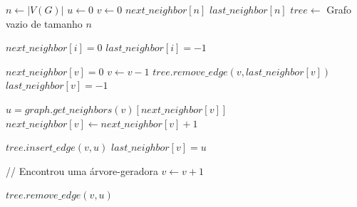 \begin{algorithm}[!hp]
\begin{footnotesize}
\SetAlgoLined
{}
\Begin
{
    $n \gets |V(G)|$\;
    $u \gets 0$\;
    $v \gets 0$\;
    $next\_neighbor[n]$\;
    $last\_neighbor[n]$\;
    $tree \gets$ Grafo vazio de tamanho $n$\;

    {
        $next\_neighbor[i] = 0$\;
        $last\_neighbor[i] = -1$\;
    }

    {
        {
            $next\_neighbor[v] = 0$\;
            $v \gets v - 1$\;
            {
                \Break
            }
            $tree.remove\_edge(v, last\_neighbor[v])$\;
            $last\_neighbor[v] = -1$\;
        }
        \Else
        {
            $u = graph.get\_neighbors(v)[next\_neighbor[v]]$\;
            $next\_neighbor[v] \gets next\_neighbor[v] + 1$\;

            {
                $tree.insert\_edge(v, u)$\;
                $last\_neighbor[v] = u$

                {
                    {
                        // Encontrou uma árvore-geradora
                    }
                    \Else
                    {
                        $v \gets v + 1$\;
                    }
                }

                $tree.remove\_edge(v, u)$\;
            }
        }
    }
}
\caption{\textsc{$generate\_sequential$}\label{alg:generate_sequential}}
\end{footnotesize}
\end{algorithm}